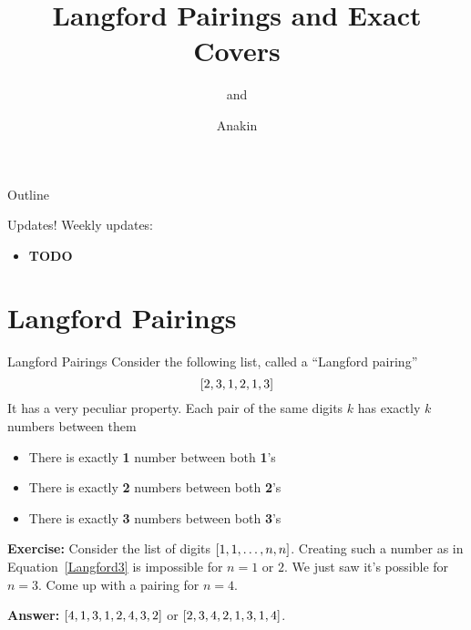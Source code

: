 \documentclass[aspectratio=169]{beamer}
\title{Langford Pairings and Exact Covers}
\subtitle{\cite[Chapter~7]{TAOCP4A} and \cite[Chapter~7.2.2.1]{TAOCP4B}}
\author{Anakin}
\date{}
\begin{document}

\begin{frame}
\titlepage
\end{frame}

\begin{frame}{Outline}
  \tableofcontents
\end{frame}

\begin{frame}{Updates!}
  Weekly updates:
    \begin{itemize}
        \item \textbf{TODO}
    \end{itemize}
\end{frame}

\section{Langford Pairings}
\frame{\sectionpage}

\begin{frame}{Langford Pairings}
    Consider the following list, called a ``Langford pairing''
    \begin{equation}\label{Langford3}
        \bqty{2, 3, 1, 2, 1, 3}
    \end{equation}
    It has a very peculiar property. Each pair of the same digits $k$ has exactly $k$ numbers between them \pause
    \begin{itemize}
        \item There is exactly \textbf{1} number between both \textbf{1}'s
        \item There is exactly \textbf{2} numbers between both \textbf{2}'s
        \item There is exactly \textbf{3} numbers between both \textbf{3}'s
    \end{itemize} \pause
    \textcolor{sigma@alertred}{\textbf{Exercise:}} Consider the list of digits $\bqty{1, 1, \ldots, n, n}$. Creating such a number as in Equation~\ref{Langford3} is impossible for $n = 1$ or $2$. We just saw it's possible for $n = 3$. Come up with a pairing for $n = 4$.\pause 
    
    \textcolor{sigma@mainblue}{\textbf{Answer:}} $\bqty{4, 1, 3, 1, 2, 4, 3, 2}$ or $\bqty{2, 3, 4, 2, 1, 3, 1, 4}$.
\end{frame}
\end{document}
